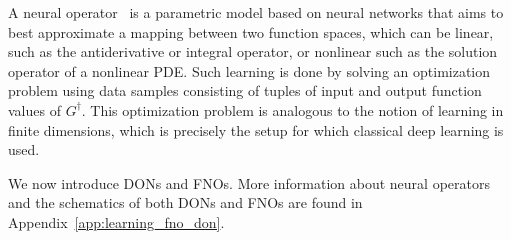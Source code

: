 A neural operator~\citep{li_fourier_2021,li_neural_2020,lu20201DeepONet} is a parametric model based on neural networks that aims to best approximate a 
mapping between two function spaces, which %
can be linear, such as the antiderivative or integral operator, or nonlinear such as the solution operator of a nonlinear PDE. %
Such learning 
is done by solving an optimization problem  
using data samples consisting of tuples of input and output function values of $G^\dagger$. %
%
This optimization problem is analogous to the notion of learning in finite dimensions, which is precisely the setup for which classical deep learning is used.

We now introduce %
DONs and FNOs. %
More information about neural operators and the schematics of both DONs and FNOs %
are found in Appendix~\ref{app:learning_fno_don}.


%
%
